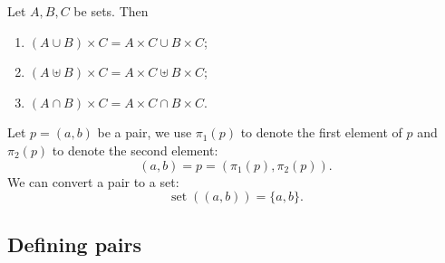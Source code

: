 \begin{lemma} \label{productUnionIntersection}
Let $A,B,C$ be sets. Then
\begin{enumerate}
\item $(A\cup B)\times C = A\times C \cup B\times C$;
\item $(A\uplus B)\times C = A\times C \uplus B\times C$;
\item $(A\cap B)\times C = A\times C\cap B\times C$.
\end{enumerate}
\end{lemma}

\begin{definition}
Let $p = (a,b)$ be a pair, we use $\pi_1(p)$ to denote the first element of $p$ and $\pi_2(p)$ to denote the second element:
\[ (a,b) = p = (\pi_1(p),\pi_2(p)). \]
We can convert a pair to a set:
\[ \operatorname{set}((a,b)) = \{a,b\}. \]
\end{definition}
\subsection{Defining pairs}
